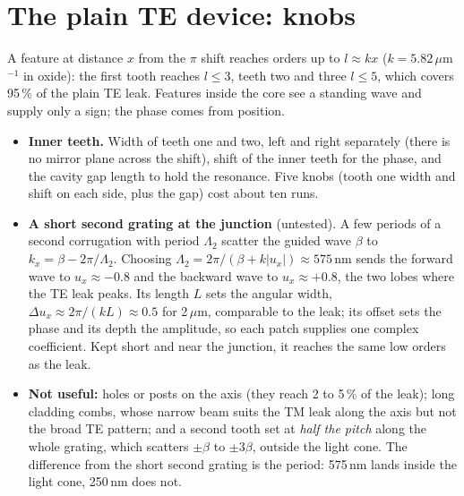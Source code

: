 \documentclass[11pt]{article}
\begin{document}
\section{The plain TE device: knobs}
A feature at distance $x$ from the $\pi$ shift reaches orders up to $l\approx kx$ ($k=5.82\,\mu$m$^{-1}$ in oxide): the first tooth reaches $l\le3$, teeth two and three $l\le5$, which covers 95\,\% of the plain TE leak. Features inside the core see a standing wave and supply only a sign; the phase comes from position.
\begin{itemize}
\item \textbf{Inner teeth.} Width of teeth one and two, left and right separately (there is no mirror plane across the shift), shift of the inner teeth for the phase, and the cavity gap length to hold the resonance. Five knobs (tooth one width and shift on each side, plus the gap) cost about ten runs.
\item \textbf{A short second grating at the junction} (untested). A few periods of a second corrugation with period $\Lambda_2$ scatter the guided wave $\beta$ to $k_x=\beta-2\pi/\Lambda_2$. Choosing $\Lambda_2=2\pi/(\beta+k|u_x|)\approx575$\,nm sends the forward wave to $u_x\approx-0.8$ and the backward wave to $u_x\approx+0.8$, the two lobes where the TE leak peaks. Its length $L$ sets the angular width, $\Delta u_x\approx2\pi/(kL)\approx0.5$ for 2\,$\mu$m, comparable to the leak; its offset sets the phase and its depth the amplitude, so each patch supplies one complex coefficient. Kept short and near the junction, it reaches the same low orders as the leak.
\item \textbf{Not useful:} holes or posts on the axis (they reach 2 to 5\,\% of the leak); long cladding combs, whose narrow beam suits the TM leak along the axis but not the broad TE pattern; and a second tooth set at \emph{half the pitch} along the whole grating, which scatters $\pm\beta$ to $\pm3\beta$, outside the light cone. The difference from the short second grating is the period: 575\,nm lands inside the light cone, 250\,nm does not.
\end{itemize}
\end{document}
